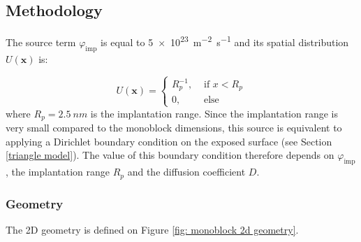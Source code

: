 


\subsection{Methodology}

The source term $\varphi_\mathrm{imp}$ is equal to \SI{5e23}{m^{-2}.s^{-1}} and its spatial distribution $U(\textbf{x})$ is:

\begin{equation}
    U(\textbf{x}) = \begin{cases}
    R_p^{-1},& \text{ if } x < R_p\\
    0,& \text{ else }
    \end{cases}
\end{equation}
where $R_p = \SI{2.5}{nm}$ is the implantation range.
Since the implantation range is very small compared to the monoblock dimensions, this source is equivalent to applying a Dirichlet boundary condition on the exposed surface (see Section \ref{triangle model}).
The value of this boundary condition therefore depends on $\varphi_\mathrm{imp}$, the implantation range $R_p$ and the diffusion coefficient $D$.

\subsubsection{Geometry}
The 2D geometry is defined on Figure \ref{fig: monoblock 2d geometry}.

